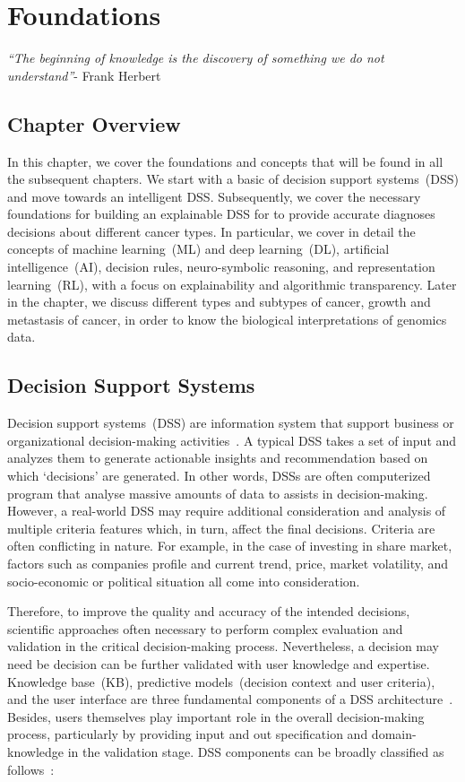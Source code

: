 \chapter{Foundations}
\label{chapter:preli}
\textit{``The beginning of knowledge is the discovery of something we do not understand''}- Frank Herbert 

\section{Chapter Overview}
In this chapter, we cover the foundations and concepts that will be found in all the subsequent chapters. We start with a basic of decision support systems~(DSS) and move towards an intelligent DSS. Subsequently, we cover the necessary foundations for building an explainable DSS for to provide accurate diagnoses decisions about different cancer types. In particular, we cover in detail the concepts of machine learning~(ML) and deep learning~(DL), artificial intelligence~(AI), decision rules, neuro-symbolic reasoning, and representation learning~(RL), with a focus on explainability and algorithmic transparency. Later in the chapter, we discuss different types and subtypes of cancer, growth and metastasis of cancer, in order to know the biological interpretations of genomics data. 

\section{Decision Support Systems}\label{sec:DSS}
Decision support systems~(DSS) are information system that support business or organizational decision-making activities~\cite{hackathorn1981organizational}. A typical DSS takes a set of input and analyzes them to generate actionable insights and recommendation based on which `decisions' are generated. 
In other words, DSSs are often computerized program that analyse massive amounts of data to assists in decision-making. 
However, a real-world DSS may require additional consideration and analysis of multiple criteria features which, in turn, affect the final decisions.  Criteria are often conflicting in nature. For example, in the case of investing in share market, factors such as companies profile and current trend, price, market volatility, and socio-economic or political situation all come into consideration. 

\hspace*{3.5mm} Therefore, to improve the quality and accuracy of the intended decisions, scientific approaches often necessary to perform complex evaluation and validation in the critical decision-making process. Nevertheless, a decision may need be decision can be further validated with user knowledge and expertise. Knowledge base~(KB), predictive models~(decision context and user criteria), and the user interface are three fundamental components of a DSS architecture~\cite{hackathorn1981organizational}. Besides, users themselves play important role in the overall decision-making process, particularly by providing input and out specification and domain-knowledge in the validation stage. DSS components can be broadly classified as follows~\cite{hackathorn1981organizational}: 

